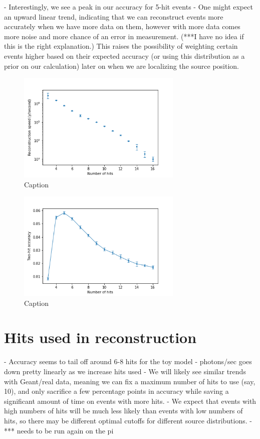 - Interestingly, we see a peak in our accuracy for 5-hit events
- One might expect an upward linear trend, indicating that we can reconstruct events more accurately when we have more data on them, however with more data comes more noise and more chance of an error in measurement. (***I have no idea if this is the right explanation.) This raises the possibility of weighting certain events higher based on their expected accuracy (or using this distribution as a prior on our calculation) later on when we are localizing the source position.

\begin{figure}
    \centering
    \includegraphics[width=0.7\textwidth]{graphs/pi_hits_speed.png}
    \caption{Caption}
    \label{fig:hits_speed}
\end{figure}

\begin{figure}
    \centering
    \includegraphics[width=0.7\textwidth]{graphs/pi_hits_acc.png}
    \caption{Caption}
    \label{fig:hits_acc}
\end{figure}


\section{Hits used in reconstruction}
- Accuracy seems to tail off around 6-8 hits for the toy model
- photons/sec goes down pretty linearly as we increase hits used
- We will likely see similar trends with Geant/real data, meaning we can fix a maximum number of hits to use (say, 10), and only sacrifice a few percentage points in accuracy while saving a significant amount of time on events with more hits.
- We expect that events with high numbers of hits will be much less likely than events with low numbers of hits, so there may be different optimal cutoffs for different source distributions.
- *** needs to be run again on the pi

